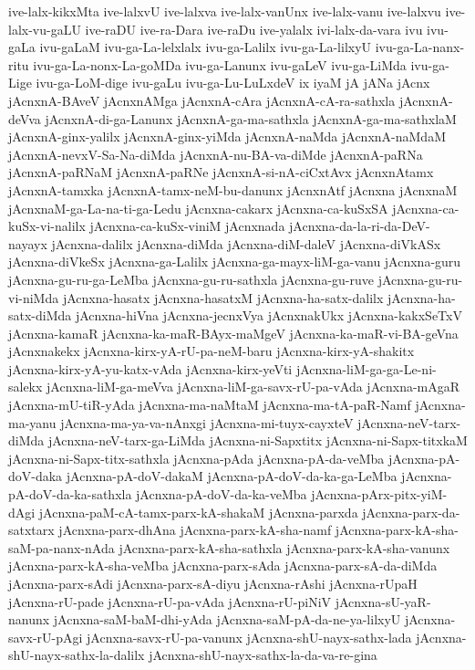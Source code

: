 {ive-lalx-kikxMta
ive-lalxvU
ive-lalxva
ive-lalx-vanUnx
ive-lalx-vanu
ive-lalxvu
ive-lalx-vu-gaLU
ive-raDU
ive-ra-Dara
ive-raDu
ive-yalalx
ivi-lalx-da-vara
ivu
ivu-gaLa
ivu-gaLaM
ivu-ga-La-lelxlalx
ivu-ga-Lalilx
ivu-ga-La-lilxyU
ivu-ga-La-nanx-ritu
ivu-ga-La-nonx-La-goMDa
ivu-ga-Lanunx
ivu-gaLeV
ivu-ga-LiMda
ivu-ga-Lige
ivu-ga-LoM-dige
ivu-gaLu
ivu-ga-Lu-LuLxdeV
ix
iyaM
jA
jANa
jAcnx
jAcnxnA-BAveV
jAcnxnAMga
jAcnxnA-cAra
jAcnxnA-cA-ra-sathxla
jAcnxnA-deVva
jAcnxnA-di-ga-Lanunx
jAcnxnA-ga-ma-sathxla
jAcnxnA-ga-ma-sathxlaM
jAcnxnA-ginx-yalilx
jAcnxnA-ginx-yiMda
jAcnxnA-naMda
jAcnxnA-naMdaM
jAcnxnA-nevxV-Sa-Na-diMda
jAcnxnA-nu-BA-va-diMde
jAcnxnA-paRNa
jAcnxnA-paRNaM
jAcnxnA-paRNe
jAcnxnA-si-nA-ciCxtAvx
jAcnxnAtamx
jAcnxnA-tamxka
jAcnxnA-tamx-neM-bu-danunx
jAcnxnAtf
jAcnxna
jAcnxnaM
jAcnxnaM-ga-La-na-ti-ga-Ledu
jAcnxna-cakarx
jAcnxna-ca-kuSxSA
jAcnxna-ca-kuSx-vi-nalilx
jAcnxna-ca-kuSx-viniM
jAcnxnada
jAcnxna-da-la-ri-da-DeV-nayayx
jAcnxna-dalilx
jAcnxna-diMda
jAcnxna-diM-daleV
jAcnxna-diVkASx
jAcnxna-diVkeSx
jAcnxna-ga-Lalilx
jAcnxna-ga-mayx-liM-ga-vanu
jAcnxna-guru
jAcnxna-gu-ru-ga-LeMba
jAcnxna-gu-ru-sathxla
jAcnxna-gu-ruve
jAcnxna-gu-ru-vi-niMda
jAcnxna-hasatx
jAcnxna-hasatxM
jAcnxna-ha-satx-dalilx
jAcnxna-ha-satx-diMda
jAcnxna-hiVna
jAcnxna-jecnxVya
jAcnxnakUkx
jAcnxna-kakxSeTxV
jAcnxna-kamaR
jAcnxna-ka-maR-BAyx-maMgeV
jAcnxna-ka-maR-vi-BA-geVna
jAcnxnakekx
jAcnxna-kirx-yA-rU-pa-neM-baru
jAcnxna-kirx-yA-shakitx
jAcnxna-kirx-yA-yu-katx-vAda
jAcnxna-kirx-yeVti
jAcnxna-liM-ga-ga-Le-ni-salekx
jAcnxna-liM-ga-meVva
jAcnxna-liM-ga-savx-rU-pa-vAda
jAcnxna-mAgaR
jAcnxna-mU-tiR-yAda
jAcnxna-ma-naMtaM
jAcnxna-ma-tA-paR-Namf
jAcnxna-ma-yanu
jAcnxna-ma-ya-va-nAnxgi
jAcnxna-mi-tuyx-cayxteV
jAcnxna-neV-tarx-diMda
jAcnxna-neV-tarx-ga-LiMda
jAcnxna-ni-Sapxtitx
jAcnxna-ni-Sapx-titxkaM
jAcnxna-ni-Sapx-titx-sathxla
jAcnxna-pAda
jAcnxna-pA-da-veMba
jAcnxna-pA-doV-daka
jAcnxna-pA-doV-dakaM
jAcnxna-pA-doV-da-ka-ga-LeMba
jAcnxna-pA-doV-da-ka-sathxla
jAcnxna-pA-doV-da-ka-veMba
jAcnxna-pArx-pitx-yiM-dAgi
jAcnxna-paM-cA-tamx-parx-kA-shakaM
jAcnxna-parxda
jAcnxna-parx-da-satxtarx
jAcnxna-parx-dhAna
jAcnxna-parx-kA-sha-namf
jAcnxna-parx-kA-sha-saM-pa-nanx-nAda
jAcnxna-parx-kA-sha-sathxla
jAcnxna-parx-kA-sha-vanunx
jAcnxna-parx-kA-sha-veMba
jAcnxna-parx-sAda
jAcnxna-parx-sA-da-diMda
jAcnxna-parx-sAdi
jAcnxna-parx-sA-diyu
jAcnxna-rAshi
jAcnxna-rUpaH
jAcnxna-rU-pade
jAcnxna-rU-pa-vAda
jAcnxna-rU-piNiV
jAcnxna-sU-yaR-nanunx
jAcnxna-saM-baM-dhi-yAda
jAcnxna-saM-pA-da-ne-ya-lilxyU
jAcnxna-savx-rU-pAgi
jAcnxna-savx-rU-pa-vanunx
jAcnxna-shU-nayx-sathx-lada
jAcnxna-shU-nayx-sathx-la-dalilx
jAcnxna-shU-nayx-sathx-la-da-va-re-gina
}
